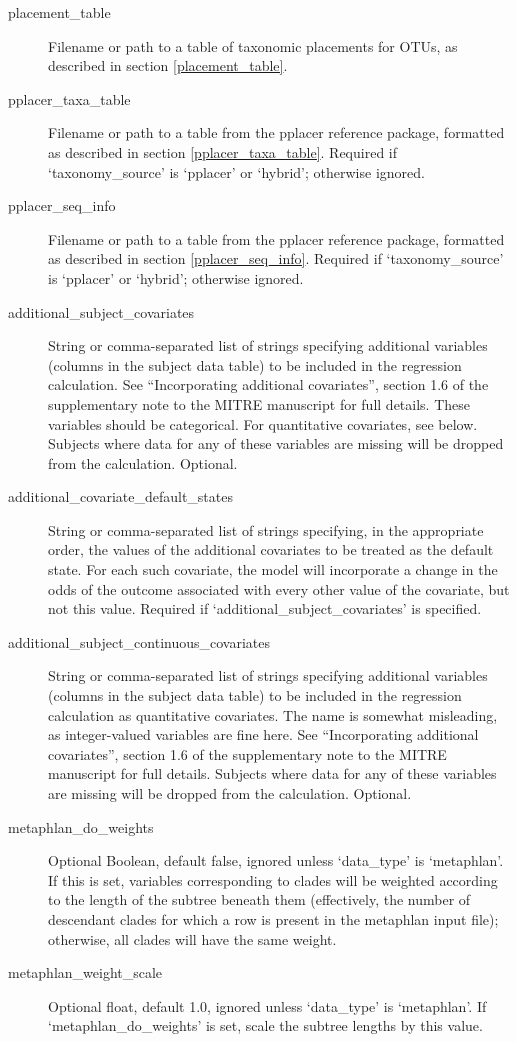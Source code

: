\documentclass[12pt]{report}
\begin{document}
\begin{description}
\item[placement\_table] Filename or path to a table of taxonomic
  placements for OTUs, as described in section \ref{placement_table}.
  
\item[pplacer\_taxa\_table] Filename or path to a table from the
  pplacer reference package, formatted as described in section
  \ref{pplacer_taxa_table}. Required if `taxonomy\_source' is
  `pplacer' or `hybrid'; otherwise ignored.
\item[pplacer\_seq\_info] Filename or path to a table from the pplacer
  reference package, formatted as described in section
  \ref{pplacer_seq_info}. Required if `taxonomy\_source' is `pplacer'
  or `hybrid'; otherwise ignored.

\item[additional\_subject\_covariates] String or comma-separated list
  of strings specifying additional variables (columns in the subject
  data table) to be included in the regression calculation. See
  ``Incorporating additional covariates'', section 1.6 of the
  supplementary note to the MITRE manuscript for full details. These
  variables should be categorical. For quantitative covariates, see
  below. Subjects where data for any of these variables
  are missing will be dropped from the calculation. Optional.
\item[additional\_covariate\_default\_states] String or
  comma-separated list of strings specifying, in the appropriate
  order, the values of the additional covariates to be treated as the
  default state. For each such covariate, the model will incorporate a
  change in the odds of the outcome associated with every other value
  of the covariate, but not this value. Required if
  `additional\_subject\_covariates' is specified.
\item[additional\_subject\_continuous\_covariates] String or
  comma-separated list of strings specifying additional variables
  (columns in the subject data table) to be included in the regression
  calculation as quantitative covariates. The name is somewhat
  misleading, as integer-valued variables are fine here. See
  ``Incorporating additional covariates'', section 1.6 of the
  supplementary note to the MITRE manuscript for full
  details. Subjects where data for any of these variables are missing
  will be dropped from the calculation. Optional.

\item[metaphlan\_do\_weights] Optional Boolean, default false, ignored
  unless `data\_type' is `metaphlan'. If this is set, variables
  corresponding to clades will be weighted according to the length of
  the subtree beneath them (effectively, the number of descendant
  clades for which a row is present in the metaphlan input file);
  otherwise, all clades will have the same weight.
\item[metaphlan\_weight\_scale] Optional float, default 1.0, ignored
  unless `data\_type' is `metaphlan'. If `metaphlan\_do\_weights' is set,
  scale the subtree lengths by this value. 
  
\end{description}
\end{document}
